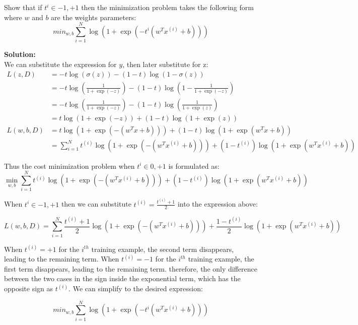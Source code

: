\documentclass[12pt]{article}
\begin{document}
	Show that if $t^i \in {-1, +1}$ then the minimization problem takes the following form where $w$ and $b$ are the weights parameters:
	\begin{equation}
		min_{w,b} \sum_{i=1}^{N} \log (1+\exp({-t^i(w^Tx^{(i)} + b)}))
	\end{equation}
	
	\begin{framed}
		\textbf{Solution:} \\
		We can substitute the expression for $y$, then later substitute for z:
		\begin{align}
			L(z,D) &= -t \log (\sigma(z)) - (1-t) \log (1-\sigma(z)) \\
			&= -t \log \left( \frac{1}{1+\exp (-z)}  \right) - (1-t) \log \left( 1 - \frac{1}{1+\exp (-z)}  \right) \\
			&= -t \log \left( \frac{1}{1+\exp (-z)}  \right) - (1-t) \log \left(\frac{1}{1+\exp (z)}  \right) \\
			&= t \log \left( 1 + \exp (-z) \right) + (1-t) \log \left( 1 + \exp(z) \right) \\
			L(w,b,D) &= t \log \left( 1 + \exp (-(w^Tx + b)) \right) + (1-t) \log \left( 1 + \exp(w^Tx+b) \right) \\
			&= \sum_{i=1}^{N} t^{(i)} \log \left( 1 + \exp (-(w^T x^{(i)} + b)) \right) + (1-t^{(i)}) \log \left( 1 + \exp(w^T x^{(i)}+b) \right) 
		\end{align}
		
		Thus the cost minimization problem when  $t^i \in {0, +1}$ is formulated as:
		\begin{equation}
			\min_{w,b} \sum_{i=1}^{N} t^{(i)} \log \left( 1 + \exp (-(w^T x^{(i)} + b)) \right) + (1-t^{(i)}) \log \left( 1 + \exp(w^T x^{(i)}+b) \right) 
		\end{equation}
		
		When $t^i \in {-1, +1}$ then we can substitute $t^{(i)} = \frac{t^{(i)} + 1}{2}$ into the expression above:
		
		\begin{equation}
			L(w,b,D) = \sum_{i=1}^{N} \frac{t^{(i)}+1}{2} \log \left( 1 + \exp (-(w^T x^{(i)} + b)) \right) + \frac{1-t^{(i)}}{2} \log \left( 1 + \exp(w^T x^{(i)}+b) \right) 
		\end{equation}
		
		When $t^{(i)} = +1$ for the $i^{th}$ training example, the second term disappears, leading to the remaining term. When $t^{(i)} = -1$ for the $i^{th}$ training example, the first term disappears, leading to the remaining term. therefore, the only difference between the two cases in the sign inside the exponential term, which has the opposite sign as $t^{(i)}$. We can simplify to the desired expression:
		
		\begin{equation}
			min_{w,b} \sum_{i=1}^{N} \log (1+\exp({-t^i(w^Tx^{(i)} + b)}))
		\end{equation}
		
	\end{framed}
	
\end{document}
